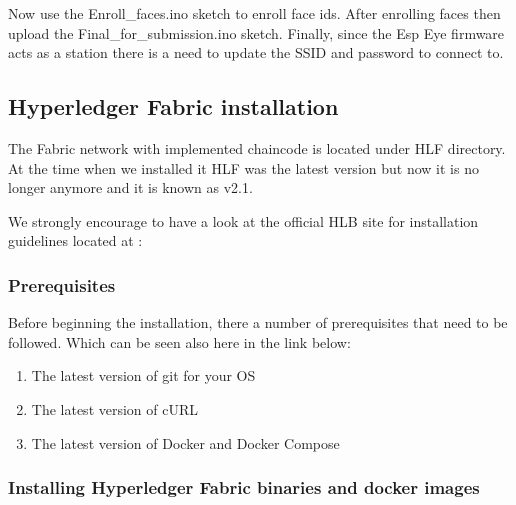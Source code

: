 
Now use the {\selectfont Enroll\_faces.ino } sketch to enroll face ids. After enrolling faces then upload the {\selectfont Final\_for\_submission.ino } sketch. Finally, since the Esp Eye firmware acts as a station there is a need to update the SSID and password to connect to. 



\subsection{Hyperledger Fabric installation}

The Fabric network with implemented chaincode is located under {\selectfont HLF } directory. At the time when we installed it HLF was the latest version but now it is no longer anymore and it is known as v2.1. 

We strongly encourage to have a look at the official HLB site for installation guidelines located at :


\subsubsection{Prerequisites}
Before beginning the installation, there a number of prerequisites that need to be followed. Which can be seen also here in the link below:



\begin{enumerate}
    \item  The latest version of git for your OS
    \item The latest version of cURL
    \item The latest version of Docker and Docker Compose
\end{enumerate}

\subsubsection{Installing Hyperledger Fabric binaries and docker images}

